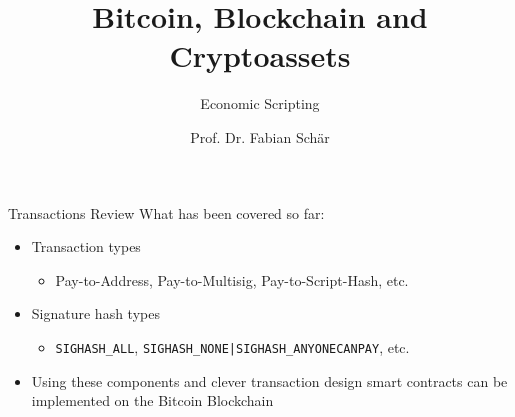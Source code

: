 \documentclass[handout]{beamer}
\title{Bitcoin, Blockchain and Cryptoassets}
\subtitle{Economic Scripting}
\author{Prof. Dr. Fabian Schär}
\institute{University of Basel}
\begin{document}
\thispagestyle{empty}
\begin{frame}[noframenumbering]
	\titlepage
\end{frame}


\begin{frame}{Transactions Review}
	What has been covered so far:
	\begin{itemize}
		\item<1 -> Transaction types
		\begin{itemize}
			\item<1 -> Pay-to-Address, Pay-to-Multisig, Pay-to-Script-Hash, etc.
		\end{itemize}
		\item<2 -> Signature hash types
		\begin{itemize}
			\item<2 -> \texttt{SIGHASH\_ALL}, \texttt{SIGHASH\_NONE|SIGHASH\_ANYONECANPAY}, etc.
		\end{itemize}
		\item<3 -> Using these components and clever transaction design smart contracts can be implemented on the Bitcoin Blockchain
	\end{itemize}
\end{frame}

\end{document}
